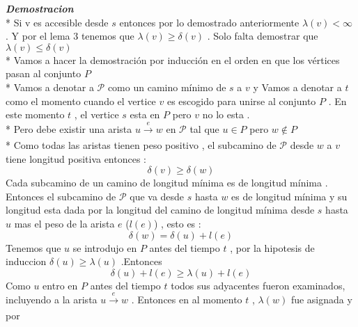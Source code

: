 \documentclass[10pt]{article}
\begin{document}
        \noindent \textit{\textbf{Demostracion}}
        \\* 
        Si v es accesible desde $s$ entonces por lo demostrado 
        anteriormente $\lambda\left(v\right) < \infty$  . Y por el lema 3  tenemos que  
        $\lambda\left(v\right) \geq \delta\left(v\right)$  . Solo falta demostrar que 
        $\lambda\left(v\right) \leq \delta\left(v\right)$
        \\*
        Vamos a hacer la demostraci\'on por inducci\'on en el orden en que los v\'ertices pasan 
        al conjunto $P$ 
        \\*
        Vamos a denotar a $\mathcal{P}$ como un camino m\'inimo de $s$ a $v$ y Vamos a denotar 
        a $t$ como el momento cuando el vertice $v$ es escogido para unirse al conjunto $P$ .
        En este momento $t$ , el vertice $s$ esta en $P$ pero $v$ no lo esta . 
        \\*
        Pero debe existir una arista $u \xrightarrow[]{e}w $ en $\mathcal{P}$ tal que $u \in P $ pero 
        $w \notin P$ 
        \\* 
        Como todas las aristas tienen peso positivo , el subcamino de $\mathcal{P}$ desde $w$ 
        a $v$ tiene longitud positiva entonces : 
        \begin{equation*}
            \delta \left(v\right) \geq \delta\left(w\right)
        \end{equation*}
        Cada subcamino de un camino de longitud m\'inima es de longitud m\'inima . Entonces el 
        subcamino de $\mathcal{P}$ que va desde $s$ hasta $w$  es de longitud m\'inima y su longitud 
        esta dada por la longitud del camino de longitud m\'inima desde $s$ hasta $u$ mas el peso de la 
        arista $e$ ($l\left(e\right)$) , esto es : 
        \begin{equation*}
            \delta\left(w\right) = \delta\left(u\right) + l\left(e\right)
        \end{equation*}
        Tenemos que $u$ se introdujo en $P$ antes del tiempo $t$ , por la hipotesis de induccion 
        $\delta\left(u\right) \geq \lambda\left(u\right)$ .Entonces 
        \begin{equation*}
            \delta\left(u\right) + l\left(e\right) \geq \lambda\left(u\right) + l\left(e\right)
        \end{equation*} 
        Como $u$ entro en $P$ antes del tiempo $t$ todos sus adyacentes fueron examinados, incluyendo
        a la arista $u \xrightarrow[]{e}w$ . Entonces en al momento $t$ , $\lambda\left(w\right)$ fue asignada y por 
\end{document}

